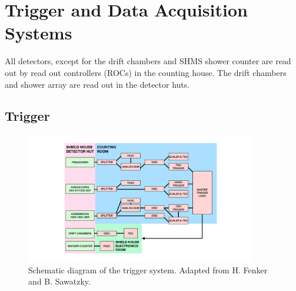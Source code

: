 \section{Trigger and Data Acquisition Systems}
\label{section:daq}

All detectors, except for the drift chambers and SHMS shower counter are read
out by read out controllers (ROCs) in the counting house.
The drift chambers and shower array are read out in the detector huts.


\subsection{Trigger}
\begin{figure}[!h]
    \centering
    \includegraphics[width=0.9\textwidth]{chap3/trigger_block_diagram.pdf}
    \caption{Schematic diagram of the trigger system.
             Adapted from H. Fenker and B. Sawatzky.
             }
    \label{fig:trigger_block_diagram}
\end{figure}

